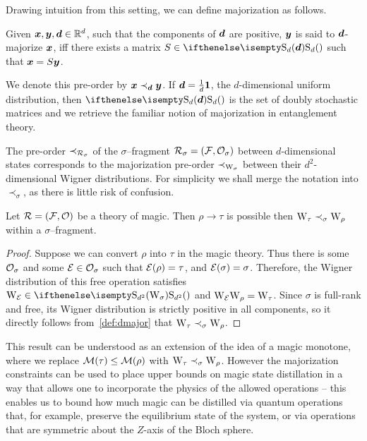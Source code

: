 \documentclass[pra,
aps,
twocolumn,
superscriptaddress,
groupedaddress,
nofootinbib,
reprint
]{revtex4-1}
\begin{document}
Drawing intuition from this setting, we can define majorization as follows.
\begin{definition}\label{def:dmajor}
    Given $\bm{x}, \bm{y}, \bm{d} \in \mathbb{R}^d$, such that the components of $\bm{d}$ are positive, $\bm{y}$ is said to $\bm{d}$-majorize $\bm{x}$, iff there exists a matrix $S \in \stoch$ such that $\bm{x} = S\bm{y}$.
\end{definition}
We denote this pre-order by $\bm{x} \prec_{\bm{d}} \bm{y}$.
If $\bm{d} = \frac{1}{d}\bm{1}$, the $d$-dimensional uniform distribution, then $\stoch$ is the set of doubly stochastic matrices and we retrieve the familiar notion of majorization in entanglement theory. 

The pre-order $\prec_{\mathcal{R}_\sigma}$ of the $\sigma$--fragment $\mathcal{R}_\sigma = (\mathcal{F}, \mathcal{O}_\sigma)$ between $d$-dimensional states corresponds to the majorization pre-order $\prec_{\W{\sigma}}$ between their $d^2$-dimensional Wigner distributions.
For simplicity we shall merge the notation into $\prec_\sigma$, as there is little risk of confusion.


\begin{theorem}\label{thm:sigmamajor}
    Let $\mathcal{R} = (\mathcal{F}, \mathcal{O})$ be a theory of magic. Then $\rho \longrightarrow \tau$ is possible then  $\W{\tau} \prec_\sigma \W{\rho}$ within a $\sigma$--fragment.
\end{theorem}
\begin{proof}
Suppose we can convert $\rho$ into $\tau$ in the magic theory. 
Thus there is some $\mathcal{O}_\sigma$ and some $\mathcal{E} \in \mathcal{O}_\sigma$ such that $\mathcal{E}(\rho) = \tau$, and $\mathcal{E}(\sigma)=\sigma$. 
Therefore, the Wigner distribution of this free operation satisfies $\W{\E} \in \stochw$ and $\W{\E}\W{\rho} = \W{\tau}$. 
Since $\sigma$ is full-rank and free, its Wigner distribution is strictly positive in all components, so it directly follows from~\cref{def:dmajor} that $\W{\tau} \prec_{\sigma} \W{\rho}$.
\end{proof}
This result can be understood as an extension of the idea of a magic monotone, where we replace $\mathcal{M}(\tau) \leq \mathcal{M}(\rho)$ with $\W{\tau} \prec_\sigma \W{\rho}$. 
However the majorization constraints can be used to place upper bounds on magic state distillation in a way that allows one to incorporate the physics of the allowed operations -- this enables us to bound how much magic can be distilled via quantum operations that, for example, preserve the equilibrium state of the system, or via operations that are symmetric about the $Z$-axis of the Bloch sphere.
\end{document}
